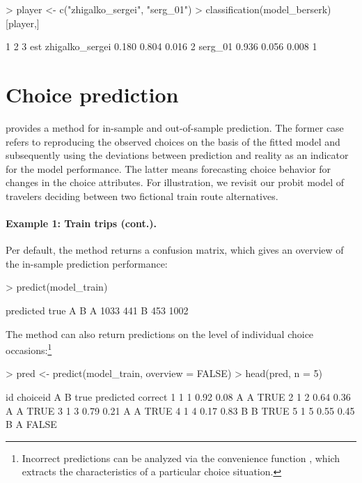 \documentclass[article,shortnames]{jss}
\newcommand{\fct}[1]{\code{#1()}}
\begin{document}
\begin{Schunk}
\begin{Sinput}
> player <- c("zhigalko_sergei", "serg_01")
> classification(model_berserk)[player,]
\end{Sinput}
\begin{Soutput}
                    1     2     3 est
zhigalko_sergei 0.180 0.804 0.016   2
serg_01         0.936 0.056 0.008   1
\end{Soutput}
\end{Schunk}

\section{Choice prediction} \label{sec:choice_prediction}

 provides a \fct{predict} method for in-sample and out-of-sample prediction. The former case refers to reproducing the observed choices on the basis of the fitted model and subsequently using the deviations between prediction and reality as an indicator for the model performance. The latter means forecasting choice behavior for changes in the choice attributes. For illustration, we revisit our probit model of travelers deciding between two fictional train route alternatives.

\paragraph{Example 1: Train trips (cont.).}

Per default, the \fct{predict} method returns a confusion matrix, which gives an overview of the in-sample prediction performance:

\begin{Schunk}
\begin{Sinput}
> predict(model_train)
\end{Sinput}
\begin{Soutput}
    predicted
true    A    B
   A 1033  441
   B  453 1002
\end{Soutput}
\end{Schunk}

The method can also return predictions on the level of individual choice occasions:\footnote{Incorrect predictions can be analyzed via the convenience function \fct{get\_cov}, which extracts the characteristics of a particular choice situation.}

\begin{Schunk}
\begin{Sinput}
> pred <- predict(model_train, overview = FALSE)
> head(pred, n = 5)
\end{Sinput}
\begin{Soutput}
  id choiceid    A    B true predicted correct
1  1        1 0.92 0.08    A         A    TRUE
2  1        2 0.64 0.36    A         A    TRUE
3  1        3 0.79 0.21    A         A    TRUE
4  1        4 0.17 0.83    B         B    TRUE
5  1        5 0.55 0.45    B         A   FALSE
\end{Soutput}
\end{Schunk}
\end{document}
